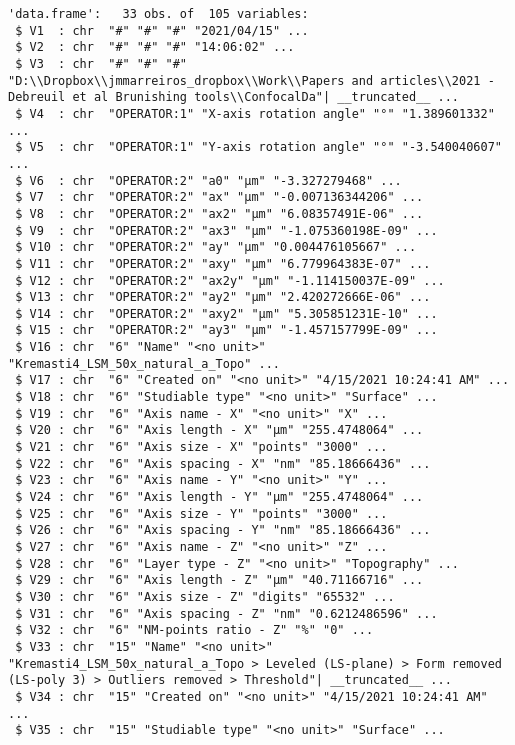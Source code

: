 \documentclass[
]{article}
\begin{document}
\begin{verbatim}
'data.frame':   33 obs. of  105 variables:
 $ V1  : chr  "#" "#" "#" "2021/04/15" ...
 $ V2  : chr  "#" "#" "#" "14:06:02" ...
 $ V3  : chr  "#" "#" "#" "D:\\Dropbox\\jmmarreiros_dropbox\\Work\\Papers and articles\\2021 - Debreuil et al Brunishing tools\\ConfocalDa"| __truncated__ ...
 $ V4  : chr  "OPERATOR:1" "X-axis rotation angle" "°" "1.389601332" ...
 $ V5  : chr  "OPERATOR:1" "Y-axis rotation angle" "°" "-3.540040607" ...
 $ V6  : chr  "OPERATOR:2" "a0" "µm" "-3.327279468" ...
 $ V7  : chr  "OPERATOR:2" "ax" "µm" "-0.007136344206" ...
 $ V8  : chr  "OPERATOR:2" "ax2" "µm" "6.08357491E-06" ...
 $ V9  : chr  "OPERATOR:2" "ax3" "µm" "-1.075360198E-09" ...
 $ V10 : chr  "OPERATOR:2" "ay" "µm" "0.004476105667" ...
 $ V11 : chr  "OPERATOR:2" "axy" "µm" "6.779964383E-07" ...
 $ V12 : chr  "OPERATOR:2" "ax2y" "µm" "-1.114150037E-09" ...
 $ V13 : chr  "OPERATOR:2" "ay2" "µm" "2.420272666E-06" ...
 $ V14 : chr  "OPERATOR:2" "axy2" "µm" "5.305851231E-10" ...
 $ V15 : chr  "OPERATOR:2" "ay3" "µm" "-1.457157799E-09" ...
 $ V16 : chr  "6" "Name" "<no unit>" "Kremasti4_LSM_50x_natural_a_Topo" ...
 $ V17 : chr  "6" "Created on" "<no unit>" "4/15/2021 10:24:41 AM" ...
 $ V18 : chr  "6" "Studiable type" "<no unit>" "Surface" ...
 $ V19 : chr  "6" "Axis name - X" "<no unit>" "X" ...
 $ V20 : chr  "6" "Axis length - X" "µm" "255.4748064" ...
 $ V21 : chr  "6" "Axis size - X" "points" "3000" ...
 $ V22 : chr  "6" "Axis spacing - X" "nm" "85.18666436" ...
 $ V23 : chr  "6" "Axis name - Y" "<no unit>" "Y" ...
 $ V24 : chr  "6" "Axis length - Y" "µm" "255.4748064" ...
 $ V25 : chr  "6" "Axis size - Y" "points" "3000" ...
 $ V26 : chr  "6" "Axis spacing - Y" "nm" "85.18666436" ...
 $ V27 : chr  "6" "Axis name - Z" "<no unit>" "Z" ...
 $ V28 : chr  "6" "Layer type - Z" "<no unit>" "Topography" ...
 $ V29 : chr  "6" "Axis length - Z" "µm" "40.71166716" ...
 $ V30 : chr  "6" "Axis size - Z" "digits" "65532" ...
 $ V31 : chr  "6" "Axis spacing - Z" "nm" "0.6212486596" ...
 $ V32 : chr  "6" "NM-points ratio - Z" "%" "0" ...
 $ V33 : chr  "15" "Name" "<no unit>" "Kremasti4_LSM_50x_natural_a_Topo > Leveled (LS-plane) > Form removed (LS-poly 3) > Outliers removed > Threshold"| __truncated__ ...
 $ V34 : chr  "15" "Created on" "<no unit>" "4/15/2021 10:24:41 AM" ...
 $ V35 : chr  "15" "Studiable type" "<no unit>" "Surface" ...

\end{verbatim}
\end{document}
